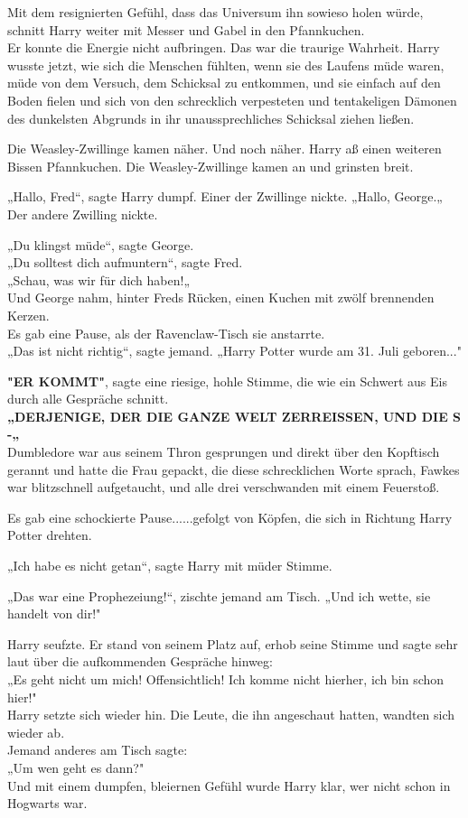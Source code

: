 {Mit dem resignierten Gefühl, dass das Universum ihn sowieso holen würde, schnitt Harry weiter mit Messer und Gabel in den Pfannkuchen.\\ Er konnte die Energie nicht aufbringen. Das war die traurige Wahrheit. Harry wusste jetzt, wie sich die Menschen fühlten, wenn sie des Laufens müde waren, müde von dem Versuch, dem Schicksal zu entkommen, und sie einfach auf den Boden fielen und sich von den schrecklich verpesteten und tentakeligen Dämonen des dunkelsten Abgrunds in ihr unaussprechliches Schicksal ziehen ließen.

Die Weasley-Zwillinge kamen näher. Und noch näher. Harry aß einen weiteren Bissen Pfannkuchen. Die Weasley-Zwillinge kamen an und grinsten breit.

„Hallo, Fred“, sagte Harry dumpf. Einer der Zwillinge nickte. „Hallo, George.„\\ Der andere Zwilling nickte.

„Du klingst müde“, sagte George.\\ „Du solltest dich aufmuntern“, sagte Fred.\\ „Schau, was wir für dich haben!„\\ Und George nahm, hinter Freds Rücken, einen Kuchen mit zwölf brennenden Kerzen.\\ Es gab eine Pause, als der Ravenclaw-Tisch sie anstarrte.\\ „Das ist nicht richtig“, sagte jemand. „Harry Potter wurde am 31. Juli geboren..."

\textbf{"ER KOMMT"}, sagte eine riesige, hohle Stimme, die wie ein Schwert aus Eis durch alle Gespräche schnitt.\\ \textbf{„DERJENIGE, DER DIE GANZE WELT ZERREISSEN, UND DIE S -„}\\ Dumbledore war aus seinem Thron gesprungen und direkt über den Kopftisch gerannt und hatte die Frau gepackt, die diese schrecklichen Worte sprach, Fawkes war blitzschnell aufgetaucht, und alle drei verschwanden mit einem Feuerstoß.

Es gab eine schockierte Pause......gefolgt von Köpfen, die sich in Richtung Harry Potter drehten.

„Ich habe es nicht getan“, sagte Harry mit müder Stimme.

„Das war eine Prophezeiung!“, zischte jemand am Tisch. „Und ich wette, sie handelt von dir!"

Harry seufzte. Er stand von seinem Platz auf, erhob seine Stimme und sagte sehr laut über die aufkommenden Gespräche hinweg:\\ „Es geht nicht um mich! Offensichtlich! Ich komme nicht hierher, ich bin schon hier!"\\ Harry setzte sich wieder hin. Die Leute, die ihn angeschaut hatten, wandten sich wieder ab.\\ Jemand anderes am Tisch sagte:\\ „Um wen geht es dann?"\\ Und mit einem dumpfen, bleiernen Gefühl wurde Harry klar, wer nicht schon in Hogwarts war.

}
